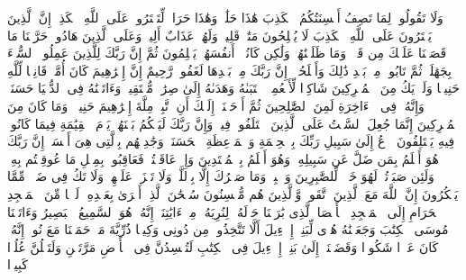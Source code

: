 \stopbuffer
\startbuffer[\q:16:116]
وَلَا تَقُولُوا۟ لِمَا تَصِفُ أَلۡسِنَتُكُمُ ٱلۡكَذِبَ هَٰذَا حَلَٰلࣱ وَهَٰذَا حَرَامࣱ لِّتَفۡتَرُوا۟ عَلَى ٱللَّهِ ٱلۡكَذِبَۚ إِنَّ ٱلَّذِینَ یَفۡتَرُونَ عَلَى ٱللَّهِ ٱلۡكَذِبَ لَا یُفۡلِحُونَ%
\stopbuffer
\startbuffer[\q:16:117]
مَتَٰعࣱ قَلِیلࣱ وَلَهُمۡ عَذَابٌ أَلِیمࣱ%
\stopbuffer
\startbuffer[\q:16:118]
وَعَلَى ٱلَّذِینَ هَادُوا۟ حَرَّمۡنَا مَا قَصَصۡنَا عَلَیۡكَ مِن قَبۡلُۖ وَمَا ظَلَمۡنَٰهُمۡ وَلَٰكِن كَانُوۤا۟ أَنفُسَهُمۡ یَظۡلِمُونَ%
\stopbuffer
\startbuffer[\q:16:119]
ثُمَّ إِنَّ رَبَّكَ لِلَّذِینَ عَمِلُوا۟ ٱلسُّوۤءَ بِجَهَٰلَةࣲ ثُمَّ تَابُوا۟ مِنۢ بَعۡدِ ذَٰلِكَ وَأَصۡلَحُوۤا۟ إِنَّ رَبَّكَ مِنۢ بَعۡدِهَا لَغَفُورࣱ رَّحِیمٌ%
\stopbuffer
\startbuffer[\q:16:120]
إِنَّ إِبۡرَٰهِیمَ كَانَ أُمَّةࣰ قَانِتࣰا لِّلَّهِ حَنِیفࣰا وَلَمۡ یَكُ مِنَ ٱلۡمُشۡرِكِینَ%
\stopbuffer
\startbuffer[\q:16:121]
شَاكِرࣰا لِّأَنۡعُمِهِۚ ٱجۡتَبَىٰهُ وَهَدَىٰهُ إِلَىٰ صِرَٰطࣲ مُّسۡتَقِیمࣲ%
\stopbuffer
\startbuffer[\q:16:122]
وَءَاتَیۡنَٰهُ فِی ٱلدُّنۡیَا حَسَنَةࣰۖ وَإِنَّهُۥ فِی ٱلۡءَاخِرَةِ لَمِنَ ٱلصَّٰلِحِینَ%
\stopbuffer
\startbuffer[\q:16:123]
ثُمَّ أَوۡحَیۡنَاۤ إِلَیۡكَ أَنِ ٱتَّبِعۡ مِلَّةَ إِبۡرَٰهِیمَ حَنِیفࣰاۖ وَمَا كَانَ مِنَ ٱلۡمُشۡرِكِینَ%
\stopbuffer
\startbuffer[\q:16:124]
إِنَّمَا جُعِلَ ٱلسَّبۡتُ عَلَى ٱلَّذِینَ ٱخۡتَلَفُوا۟ فِیهِۚ وَإِنَّ رَبَّكَ لَیَحۡكُمُ بَیۡنَهُمۡ یَوۡمَ ٱلۡقِیَٰمَةِ فِیمَا كَانُوا۟ فِیهِ یَخۡتَلِفُونَ%
\stopbuffer
\startbuffer[\q:16:125]
ٱدۡعُ إِلَىٰ سَبِیلِ رَبِّكَ بِٱلۡحِكۡمَةِ وَٱلۡمَوۡعِظَةِ ٱلۡحَسَنَةِۖ وَجَٰدِلۡهُم بِٱلَّتِی هِیَ أَحۡسَنُۚ إِنَّ رَبَّكَ هُوَ أَعۡلَمُ بِمَن ضَلَّ عَن سَبِیلِهِۦ وَهُوَ أَعۡلَمُ بِٱلۡمُهۡتَدِینَ%
\stopbuffer
\startbuffer[\q:16:126]
وَإِنۡ عَاقَبۡتُمۡ فَعَاقِبُوا۟ بِمِثۡلِ مَا عُوقِبۡتُم بِهِۦۖ وَلَئِن صَبَرۡتُمۡ لَهُوَ خَیۡرࣱ لِّلصَّٰبِرِینَ%
\stopbuffer
\startbuffer[\q:16:127]
وَٱصۡبِرۡ وَمَا صَبۡرُكَ إِلَّا بِٱللَّهِۚ وَلَا تَحۡزَنۡ عَلَیۡهِمۡ وَلَا تَكُ فِی ضَیۡقࣲ مِّمَّا یَمۡكُرُونَ%
\stopbuffer
\startbuffer[\q:16:128]
إِنَّ ٱللَّهَ مَعَ ٱلَّذِینَ ٱتَّقَوا۟ وَّٱلَّذِینَ هُم مُّحۡسِنُونَ%
\stopbuffer
\startbuffer[\q:17:1]
سُبۡحَٰنَ ٱلَّذِیۤ أَسۡرَىٰ بِعَبۡدِهِۦ لَیۡلࣰا مِّنَ ٱلۡمَسۡجِدِ ٱلۡحَرَامِ إِلَى ٱلۡمَسۡجِدِ ٱلۡأَقۡصَا ٱلَّذِی بَٰرَكۡنَا حَوۡلَهُۥ لِنُرِیَهُۥ مِنۡ ءَایَٰتِنَاۤۚ إِنَّهُۥ هُوَ ٱلسَّمِیعُ ٱلۡبَصِیرُ%
\stopbuffer
\startbuffer[\q:17:2]
وَءَاتَیۡنَا مُوسَى ٱلۡكِتَٰبَ وَجَعَلۡنَٰهُ هُدࣰى لِّبَنِیۤ إِسۡرَٰۤءِیلَ أَلَّا تَتَّخِذُوا۟ مِن دُونِی وَكِیلࣰا%
\stopbuffer
\startbuffer[\q:17:3]
ذُرِّیَّةَ مَنۡ حَمَلۡنَا مَعَ نُوحٍۚ إِنَّهُۥ كَانَ عَبۡدࣰا شَكُورࣰا%
\stopbuffer
\startbuffer[\q:17:4]
وَقَضَیۡنَاۤ إِلَىٰ بَنِیۤ إِسۡرَٰۤءِیلَ فِی ٱلۡكِتَٰبِ لَتُفۡسِدُنَّ فِی ٱلۡأَرۡضِ مَرَّتَیۡنِ وَلَتَعۡلُنَّ عُلُوࣰّا كَبِیرࣰا%
